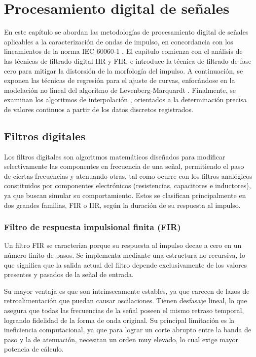 \newpage
\chapter{Procesamiento digital de señales}
\vspace{3\baselineskip}

En este capítulo se abordan las metodologías de procesamiento digital de señales aplicables a la caracterización de ondas de impulso, en concordancia con los lineamientos de la norma IEC 60060-1 \cite{iec60060_1}. El capítulo comienza con el análisis de las técnicas de filtrado digital IIR y FIR, e introduce la técnica de filtrado de fase cero para mitigar la distorsión de la morfología del impulso. A continuación, se exponen las técnicas de regresión para el ajuste de curvas, enfocándose en la modelación no lineal del algoritmo de Levenberg-Marquardt \cite{Chapra2015}. Finalmente, se examinan los algoritmos de interpolación \cite{Chapra2015}, orientados a la determinación precisa de valores continuos a partir de los datos discretos registrados.

\section{Filtros digitales}
\vspace{3\baselineskip}

Los filtros digitales \cite{asn_iir_fir_2020} son algoritmos matemáticos diseñados para modificar selectivamente las componentes en frecuencia de una señal, permitiendo el paso de ciertas frecuencias y atenuando otras, tal como ocurre con los filtros analógicos constituidos por componentes electrónicos (resistencias, capacitores e inductores), ya que buscan simular su comportamiento. Estos se clasifican principalmente en dos grandes familias, FIR o IIR, según la duración de su respuesta al impulso.

\subsection{Filtro de respuesta impulsional finita (FIR)}

Un filtro FIR \cite{siemens_fir_iir} se caracteriza porque su respuesta al impulso decae a cero en un número finito de pasos. Se implementa mediante una estructura no recursiva, lo que significa que la salida actual del filtro depende exclusivamente de los valores presentes y pasados de la señal de entrada.

Su mayor ventaja es que son intrínsecamente estables, ya que carecen de lazos de retroalimentación que puedan causar oscilaciones. Tienen desfasaje lineal, lo que asegura que todas las frecuencias de la señal poseen el mismo retraso temporal, logrando fidelidad de la forma de onda original. Su principal limitación es la ineficiencia computacional, ya que para lograr un corte abrupto entre la banda de paso y la de atenuación, necesitan un orden muy elevado, lo cual exige mayor potencia de cálculo.

